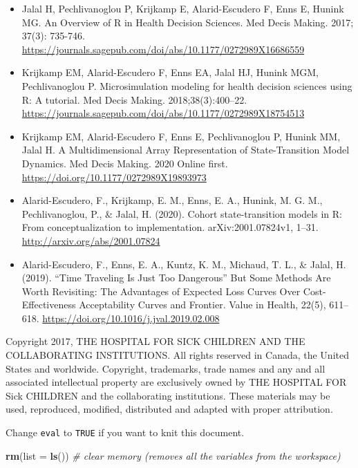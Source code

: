 \documentclass[]{article}
\newenvironment{Shaded}{\begin{snugshade}}{\end{snugshade}}
\newcommand{\KeywordTok}[1]{\textcolor[rgb]{0.13,0.29,0.53}{\textbf{#1}}}
\newcommand{\DataTypeTok}[1]{\textcolor[rgb]{0.13,0.29,0.53}{#1}}
\newcommand{\CommentTok}[1]{\textcolor[rgb]{0.56,0.35,0.01}{\textit{#1}}}
\newcommand{\NormalTok}[1]{#1}
\begin{document}
\begin{itemize}
\item
  Jalal H, Pechlivanoglou P, Krijkamp E, Alarid-Escudero F, Enns E,
  Hunink MG. An Overview of R in Health Decision Sciences. Med Decis
  Making. 2017; 37(3): 735-746.
  \url{https://journals.sagepub.com/doi/abs/10.1177/0272989X16686559}
\item
  Krijkamp EM, Alarid-Escudero F, Enns EA, Jalal HJ, Hunink MGM,
  Pechlivanoglou P. Microsimulation modeling for health decision
  sciences using R: A tutorial. Med Decis Making. 2018;38(3):400--22.
  \url{https://journals.sagepub.com/doi/abs/10.1177/0272989X18754513}
\item
  Krijkamp EM, Alarid-Escudero F, Enns E, Pechlivanoglou P, Hunink MM,
  Jalal H. A Multidimensional Array Representation of State-Transition
  Model Dynamics. Med Decis Making. 2020 Online first.
  \url{https://doi.org/10.1177/0272989X19893973}
\item
  Alarid-Escudero, F., Krijkamp, E. M., Enns, E. A., Hunink, M. G. M.,
  Pechlivanoglou, P., \& Jalal, H. (2020). Cohort state-transition
  models in R: From conceptualization to implementation.
  arXiv:2001.07824v1, 1--31. \url{http://arxiv.org/abs/2001.07824}
\item
  Alarid-Escudero, F., Enns, E. A., Kuntz, K. M., Michaud, T. L., \&
  Jalal, H. (2019). ``Time Traveling Is Just Too Dangerous'' But Some
  Methods Are Worth Revisiting: The Advantages of Expected Loss Curves
  Over Cost-Effectiveness Acceptability Curves and Frontier. Value in
  Health, 22(5), 611--618.
  \url{https://doi.org/10.1016/j.jval.2019.02.008}
\end{itemize}

Copyright 2017, THE HOSPITAL FOR SICK CHILDREN AND THE COLLABORATING
INSTITUTIONS. All rights reserved in Canada, the United States and
worldwide. Copyright, trademarks, trade names and any and all associated
intellectual property are exclusively owned by THE HOSPITAL FOR Sick
CHILDREN and the collaborating institutions. These materials may be
used, reproduced, modified, distributed and adapted with proper
attribution.

\newpage

Change \texttt{eval} to \texttt{TRUE} if you want to knit this document.

\begin{Shaded}
\begin{Highlighting}[]
\KeywordTok{rm}\NormalTok{(}\DataTypeTok{list =} \KeywordTok{ls}\NormalTok{())      }\CommentTok{# clear memory (removes all the variables from the workspace)}
\end{Highlighting}
\end{Shaded}
\end{document}

